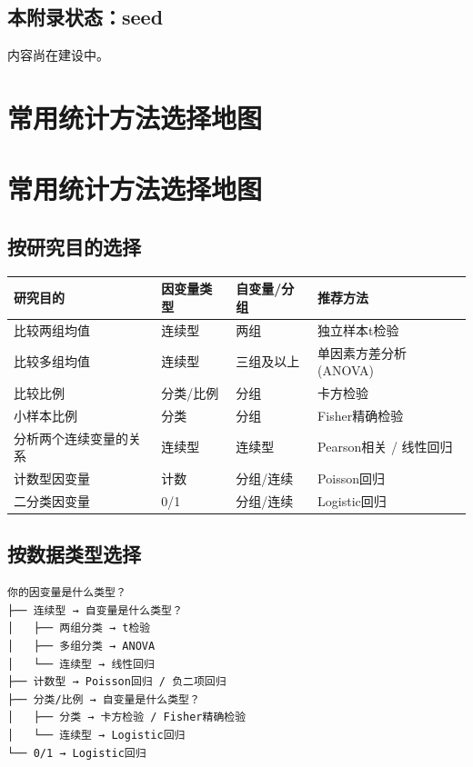 \documentclass[
  letterpaper,
]{scrbook}
\newcounter{none} %
\begin{document}
\section{本附录状态：seed}\label{ux672cux9644ux5f55ux72b6ux6001seed}

内容尚在建设中。

\chapter{常用统计方法选择地图}\label{ux5e38ux7528ux7edfux8ba1ux65b9ux6cd5ux9009ux62e9ux5730ux56fe}

\chapter{常用统计方法选择地图}\label{ux5e38ux7528ux7edfux8ba1ux65b9ux6cd5ux9009ux62e9ux5730ux56fe-1}

\section{按研究目的选择}\label{ux6309ux7814ux7a76ux76eeux7684ux9009ux62e9}

{\def\LTcaptype{none} %
\begin{longtable}[]{@{}llll@{}}
\toprule\noalign{}
研究目的 & 因变量类型 & 自变量/分组 & 推荐方法 \\
\midrule\noalign{}
\endhead
\bottomrule\noalign{}
\endlastfoot
比较两组均值 & 连续型 & 两组 & 独立样本t检验 \\
比较多组均值 & 连续型 & 三组及以上 & 单因素方差分析(ANOVA) \\
比较比例 & 分类/比例 & 分组 & 卡方检验 \\
小样本比例 & 分类 & 分组 & Fisher精确检验 \\
分析两个连续变量的关系 & 连续型 & 连续型 & Pearson相关 / 线性回归 \\
计数型因变量 & 计数 & 分组/连续 & Poisson回归 \\
二分类因变量 & 0/1 & 分组/连续 & Logistic回归 \\
\end{longtable}
}

\section{按数据类型选择}\label{ux6309ux6570ux636eux7c7bux578bux9009ux62e9}

\begin{verbatim}
你的因变量是什么类型？
├── 连续型 → 自变量是什么类型？
│   ├── 两组分类 → t检验
│   ├── 多组分类 → ANOVA
│   └── 连续型 → 线性回归
├── 计数型 → Poisson回归 / 负二项回归
├── 分类/比例 → 自变量是什么类型？
│   ├── 分类 → 卡方检验 / Fisher精确检验
│   └── 连续型 → Logistic回归
└── 0/1 → Logistic回归
\end{verbatim}
\end{document}
